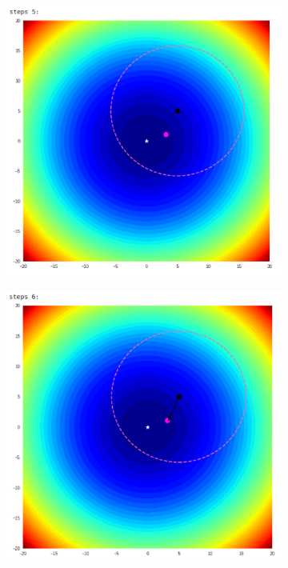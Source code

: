 \documentclass{book}
\begin{document}
\begin{itemize}
\begin{figure}[H]
\begin{figure}[H]
\begin{minipage}[c]{0.3\textwidth}
            \end{minipage}
            \begin{minipage}[c]{0.3\textwidth}
                \centering
                \includegraphics[width=\textwidth]{images/one_plus_one_ex_step_5.png}
            \end{minipage}
        \end{figure}
            \begin{figure}[H]
            \begin{minipage}[c]{0.45\textwidth}
                \centering
                \includegraphics[width=\textwidth]{images/one_plus_one_ex_step_6.png}

\end{minipage}
\end{figure}
\end{figure}
\end{itemize}
\end{document}
